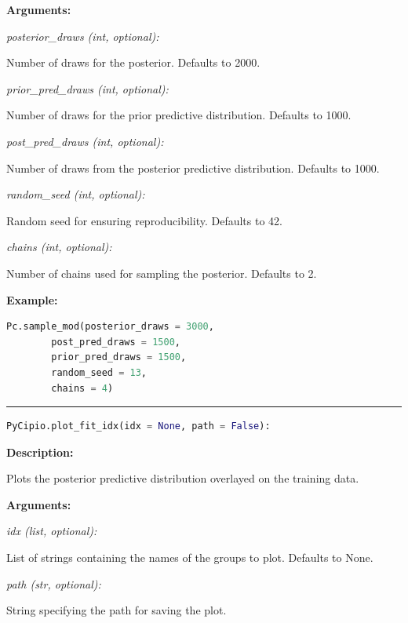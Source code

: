 \documentclass{article}
\begin{document}
\indent \textbf{Arguments:}

\indent \indent \textit{posterior\_draws (int, optional):} 

\indent \indent \indent Number of draws for the posterior. Defaults to 2000.

\indent \indent \textit{prior\_pred\_draws (int, optional):} 

\indent \indent \indent Number of draws for the prior predictive distribution. Defaults to 1000.

\indent \indent \textit{post\_pred\_draws (int, optional):} 

\indent \indent \indent Number of draws from the posterior predictive distribution. Defaults to 1000.

\indent \indent \textit{random\_seed (int, optional):}

\indent \indent \indent Random seed for ensuring reproducibility. Defaults to 42.

\indent \indent \textit{chains (int, optional):} 

\indent \indent \indent Number of chains used for sampling the posterior. Defaults to 2.

\indent \textbf{Example:}

\begin{lstlisting}[language=Python]
        Pc.sample_mod(posterior_draws = 3000, 
        post_pred_draws = 1500, 
        prior_pred_draws = 1500, 
        random_seed = 13, 
        chains = 4)
\end{lstlisting}


\hrule

\begin{lstlisting}[language=Python]
    PyCipio.plot_fit_idx(idx = None, path = False):
\end{lstlisting}

\indent \textbf{Description:} 

\indent \indent Plots the posterior predictive distribution overlayed on the training data.

\indent \textbf{Arguments:}

\indent \indent \textit{idx (list, optional):} 

\indent \indent \indent List of strings containing the names of the groups to plot. Defaults to None.

\indent \indent \textit{path (str, optional):}

\indent \indent \indent String specifying the path for saving the plot. 
\end{document}
